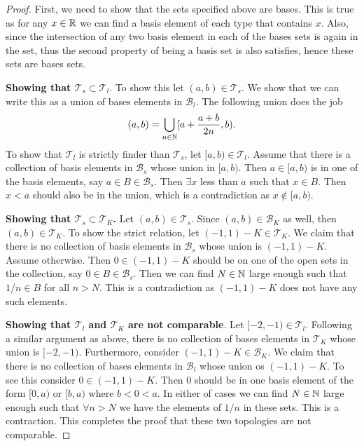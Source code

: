 \begin{proof}
	First, we need to show that the sets specified above are bases. This is true as for any $ x \in \mathbb{R} $ we can find a basis element of each type that contains $ x $. Also, since the intersection of any two basis element in each of the bases sets is again in the set, thus the second property of being a basis set is also satisfies, hence these sets are bases sets.
	
	\noindent\textbf{Showing that $ \mathcal{T}_s \subset \mathcal{T}_l $}. To show this let $ (a,b) \in \mathcal{T}_s $. We show that we can write this as a union of bases elements in $ \mathcal{B}_l $. The following union does the job
	\[ (a,b) = \bigcup_{n\in\mathbb{N}} [a + \frac{a+b}{2n},b).  \]
	To show that $ \mathcal{T}_l $ is strictly finder than $ \mathcal{T}_s $, let $ [a,b) \in \mathcal{T}_l $. Assume that there is a collection of basis elements in $ \mathcal{B}_s $ whose union in $ [a,b) $. Then $ a \in [a,b) $ is in one of the basis elements, say $ a \in B \in \mathcal{B}_s $. Then $ \exists x $ less than $ a $ such that $ x \in B $. Then $ x < a $ should also be in the union, which is a contradiction as $ x\notin [a,b) $.
	
	\noindent\textbf{Showing that $ \mathcal{T}_s \subset \mathcal{T}_K $.} Let $ (a,b) \in \mathcal{T}_s $. Since $ (a,b) \in \mathcal{B}_K $ as well, then $ (a,b) \in \mathcal{T}_K $. To show the strict relation, let $ (-1,1) - K \in \mathcal{T}_K $. We claim that there is no collection of basis elements in $ \mathcal{B}_s $ whose union is $ (-1,1) - K $. Assume otherwise. Then $ 0 \in (-1,1)-K $ should be on one of the open sets in the collection, say $ 0 \in B \in \mathcal{B}_s $. Then we can find $ N \in \mathbb{N} $ large enough such that $ 1/n \in B $ for all $ n > N $. This is a contradiction as $ (-1,1)-K $ does not have any such elements.  
	
	\noindent\textbf{Showing that $ \mathcal{T}_l $ and $ \mathcal{T}_K $ are not comparable}. Let $ [-2,-1) \in \mathcal{T}_l $. Following a similar argument as above, there is no collection of bases elements in $ \mathcal{T}_K $ whose union is $ [-2,-1) $. Furthermore, consider $ (-1,1)-K \in \mathcal{B}_K $. We claim that there is no collection of bases elements in $ \mathcal{B}_l $ whose union os $ (-1,1)- K $. To see this consider $ 0 \in (-1,1) - K $. Then $ 0 $ should be in one basis element of the form $ [0,a) $ or $ [b,a) $ where $ b<0<a $. In either of cases we can find $ N \in \mathbb{N} $ large enough such that $ \forall n > N $ we have the elements of $ 1/n $ in these sets. This is a contraction. This completes the proof that these two topologies are not comparable.
\end{proof}


